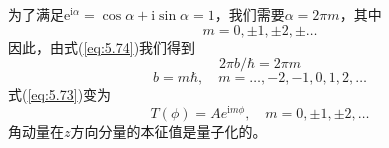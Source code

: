     为了满足$\mathrm{e}^{\mathrm{i}\alpha} = \cos\alpha + \mathrm{i}\sin\alpha = 1$，我们需要$\alpha = 2\pi m$，其中
    \begin{equation*}
        m = 0, \pm 1, \pm 2, \pm\ldots
    \end{equation*}
    因此，由式(\ref{eq:5.74})我们得到
    \begin{equation*}
        2\pi b/\hbar = 2\pi m
    \end{equation*}
    \begin{equation}
        b = m\hbar, \quad m = \ldots, -2, -1, 0, 1, 2, \ldots
        \label{eq:5.75}
    \end{equation}
    式(\ref{eq:5.73})变为
    \begin{equation}
        T\left(\phi\right) = A e^{\mathrm{i}m\phi}, \quad m = 0, \pm 1, \pm 2, \ldots
        \label{eq:5.76}
    \end{equation}
    角动量在$z$方向分量的本征值是量子化的。

